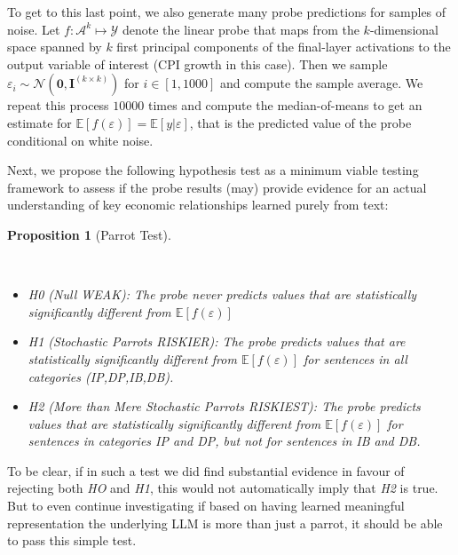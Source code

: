 \documentclass{article}
\theoremstyle{plain}
\newtheorem{proposition}[theorem]{Proposition}
\theoremstyle{definition}
\theoremstyle{remark}
\begin{document}
To get to this last point, we also generate many probe predictions for
samples of noise. Let \(f: \mathcal{A}^k \mapsto \mathcal{Y}\) denote
the linear probe that maps from the \(k\)-dimensional space spanned by
\(k\) first principal components of the final-layer activations to the
output variable of interest (CPI growth in this case). Then we sample
\(\varepsilon_i \sim \mathcal{N}(\mathbf{0},\mathbf{I}^{(k \times k)})\)
for \(i \in [1,1000]\) and compute the sample average. We repeat this
process \(10000\) times and compute the median-of-means to get an
estimate for \(\mathbb{E}[f(\varepsilon)]=\mathbb{E}[y|\varepsilon]\),
that is the predicted value of the probe conditional on white noise.

Next, we propose the following hypothesis test as a minimum viable
testing framework to assess if the probe results (may) provide evidence
for an actual understanding of key economic relationships learned purely
from text:

\begin{proposition}[Parrot
Test]\protect\hypertarget{prp-line}{}\label{prp-line}

~

\begin{itemize}
\tightlist
\item
  \emph{H0} (Null \emph{WEAK}): The probe never predicts values that are
  statistically significantly different from
  \(\mathbb{E}[f(\varepsilon)]\)
\item
  \emph{H1} (Stochastic Parrots \emph{RISKIER}): The probe predicts
  values that are statistically significantly different from
  \(\mathbb{E}[f(\varepsilon)]\) for sentences in all categories
  (IP,DP,IB,DB).
\item
  \emph{H2} (More than Mere Stochastic Parrots \emph{RISKIEST}): The
  probe predicts values that are statistically significantly different
  from \(\mathbb{E}[f(\varepsilon)]\) for sentences in categories IP and
  DP, but not for sentences in IB and DB.
\end{itemize}

\end{proposition}

To be clear, if in such a test we did find substantial evidence in
favour of rejecting both \emph{HO} and \emph{H1}, this would not
automatically imply that \emph{H2} is true. But to even continue
investigating if based on having learned meaningful representation the
underlying LLM is more than just a parrot, it should be able to pass
this simple test.
\end{document}
